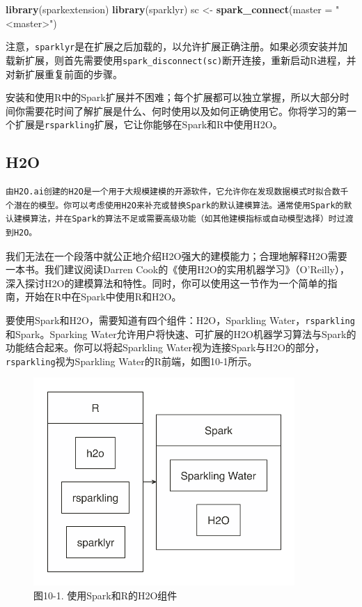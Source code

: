 \documentclass[
]{article}
\newenvironment{Shaded}{\begin{snugshade}}{\end{snugshade}}
\newcommand{\DataTypeTok}[1]{\textcolor[rgb]{0.13,0.29,0.53}{#1}}
\newcommand{\KeywordTok}[1]{\textcolor[rgb]{0.13,0.29,0.53}{\textbf{#1}}}
\newcommand{\NormalTok}[1]{#1}
\newcommand{\StringTok}[1]{\textcolor[rgb]{0.31,0.60,0.02}{#1}}
\begin{document}
\begin{Shaded}
\begin{Highlighting}[]
\KeywordTok{library}\NormalTok{(sparkextension)}
\KeywordTok{library}\NormalTok{(sparklyr)}
\NormalTok{sc <-}\StringTok{ }\KeywordTok{spark_connect}\NormalTok{(}\DataTypeTok{master =} \StringTok{"<master>"}\NormalTok{)}
\end{Highlighting}
\end{Shaded}

注意，\texttt{sparklyr}是在扩展之后加载的，以允许扩展正确注册。如果必须安装并加载新扩展，则首先需要使用\texttt{spark\_disconnect(sc)}断开连接，重新启动R进程，并对新扩展重复前面的步骤。

安装和使用R中的Spark扩展并不困难；每个扩展都可以独立掌握，所以大部分时间你需要花时间了解扩展是什么、何时使用以及如何正确使用它。你将学习的第一个扩展是\texttt{rsparkling}扩展，它让你能够在Spark和R中使用H2O。

\hypertarget{h2o}{%
\subsection{H2O}\label{h2o}}

\begin{verbatim}
由H2O.ai创建的H2O是一个用于大规模建模的开源软件，它允许你在发现数据模式时拟合数千个潜在的模型。你可以考虑使用H2O来补充或替换Spark的默认建模算法。通常使用Spark的默认建模算法，并在Spark的算法不足或需要高级功能（如其他建模指标或自动模型选择）时过渡到H2O。
\end{verbatim}

我们无法在一个段落中就公正地介绍H2O强大的建模能力；合理地解释H2O需要一本书。我们建议阅读Darren
Cook的《使用H2O的实用机器学习》（O'Reilly），深入探讨H2O的建模算法和特性。同时，你可以使用这一节作为一个简单的指南，开始在R中在Spark中使用R和H2O。

要使用Spark和H2O，需要知道有四个组件：H2O，Sparkling
Water，\texttt{rsparkling}和Spark。Sparking
Water允许用户将快速、可扩展的H2O机器学习算法与Spark的功能结合起来。你可以将起Sparkling
Water视为连接Spark与H2O的部分，\texttt{rsparkling}视为Sparkling
Water的R前端，如图10-1所示。

\begin{figure}
\centering
\includegraphics{figures/10_1.png}
\caption{图10-1. 使用Spark和R的H2O组件}
\end{figure}
\end{document}
